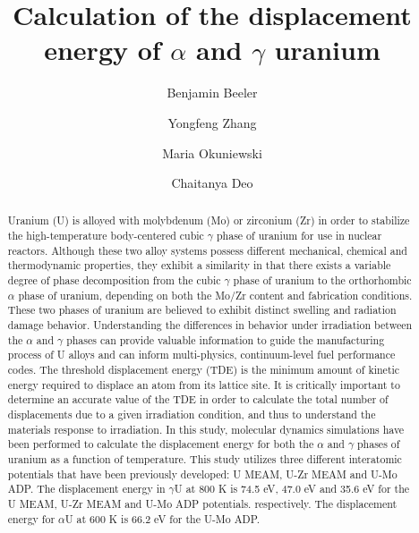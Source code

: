\documentclass[review]{elsarticle}
\begin{document}
\begin{frontmatter}
\title{Calculation of the displacement energy of $\alpha$ and $\gamma$ uranium}

\author[inl]{Benjamin Beeler}
\author[inl]{Yongfeng Zhang}
\author[pur]{Maria Okuniewski}
\author[gatech]{Chaitanya Deo}
\address[inl]{Idaho National Laboratory, Idaho Falls, ID 83415}
\address[pur]{Purdue University, West Lafayette, IN 47907}
\address[gatech]{Georgia Institute of Technology, Atlanta, GA 30332}

\begin{abstract}

Uranium (U) is alloyed with molybdenum (Mo) or zirconium (Zr) in order to stabilize the high-temperature body-centered cubic $\gamma$ phase of uranium for use in nuclear reactors. Although these two alloy systems possess different mechanical, chemical and thermodynamic properties, they exhibit a similarity in that there exists a variable degree of phase decomposition from the cubic $\gamma$ phase of uranium to the orthorhombic $\alpha$ phase of uranium, depending on both the Mo/Zr content and fabrication conditions. These two phases of uranium are believed to exhibit distinct swelling and radiation damage behavior. Understanding the differences in behavior under irradiation between the $\alpha$ and $\gamma$ phases can provide valuable information to guide the manufacturing process of U alloys and can inform multi-physics, continuum-level fuel performance codes. The threshold displacement energy (TDE) is the minimum amount of kinetic energy required to displace an atom from its lattice site. It is critically important to determine an accurate value of the TDE in order to calculate the total number of displacements due to a given irradiation condition, and thus to understand the materials response to irradiation. In this study, molecular dynamics simulations have been performed to calculate the displacement energy for both the $\alpha$ and $\gamma$ phases of uranium as a function of temperature. This study utilizes three different interatomic potentials that have been previously developed: U MEAM, U-Zr MEAM and U-Mo ADP. The displacement energy in $\gamma$U at 800 K is 74.5 eV, 47.0 eV and 35.6 eV for the U MEAM, U-Zr MEAM and U-Mo ADP potentials. respectively. The displacement energy for $\alpha$U at 600 K is 66.2 eV for the U-Mo ADP. 
\end{abstract}
\end{frontmatter}
\end{document}
